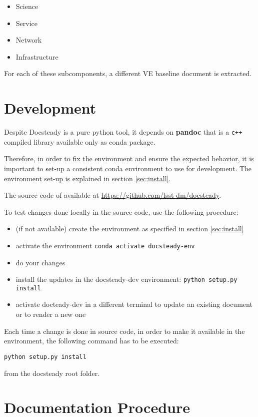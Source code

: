 \documentclass[DM]{lsstdoc}
\begin{document}
\begin{itemize}
\item Science
\item Service
\item Network
\item Infrastructure
\end{itemize}

For each of these subcomponents, a different VE baseline document is extracted.



\section{Development}
\label{sec:development}

Despite Docsteady is a pure python tool, it depends on \textbf{pandoc} that is a \texttt{c++} compiled library available only as conda package.

Therefore, in order to fix the environment and ensure the expected behavior, it is important to set-up a consistent conda environment to use for development.
The environment set-up is explained in section \ref{sec:install}.

The source code of available at \url{https://github.com/lsst-dm/docsteady}.

To test changes done locally in the source code, use the following procedure:

\begin{itemize}
\item (if not available) create the environment as specified in section \ref{sec:install}
\item activate the environment \texttt{conda activate docsteady-env}
\item do your changes
\item install the updates in the docsteady-dev environment: \texttt{python setup.py install}
\item activate docteady-dev in a different terminal to update an existing document or to render a new one
\end{itemize}

Each time a change is done in source code, in order to make it available in the environment, the following command has to be executed:

\texttt{python setup.py install}

from the docsteady root folder.


\section{Documentation Procedure}
\label{sec:docproc}
\end{document}
